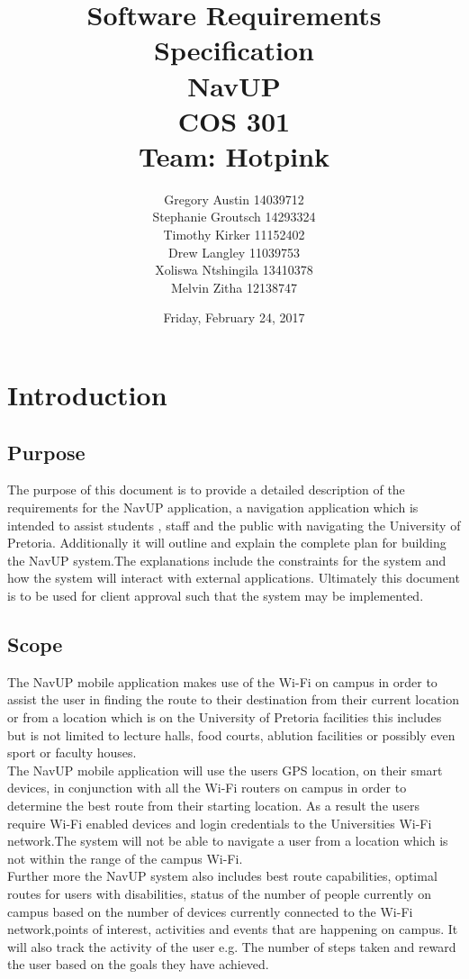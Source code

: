 \documentclass[11pt,a4paper]{article}
\title{Software Requirements Specification \\ NavUP \\ COS 301 \\ Team: Hotpink}
\date{Friday, February 24, 2017}
\author{Gregory Austin 14039712 \\ Stephanie Groutsch 14293324 \\ Timothy Kirker 11152402 \\ Drew Langley 11039753 \\ Xoliswa Ntshingila 13410378
\\ Melvin Zitha 12138747}
\begin{document}
\maketitle
\newpage
\tableofcontents

\newpage
\section{Introduction}
	\subsection{Purpose}
	The purpose of this document is to provide a detailed description of the requirements for the NavUP application, a navigation application which is intended to assist students , staff and the  public with navigating the University of Pretoria. Additionally it will outline and explain the complete plan for building the NavUP system.The explanations include the constraints for the system and how the system will interact with external applications. Ultimately this document is to be used for client approval such that the system may be implemented.

	\subsection{Scope}

		The NavUP mobile application makes use of the Wi-Fi on campus in order to assist the user in finding the route to their destination from their current location or from a location which is on the University of Pretoria facilities this includes but is not limited to lecture halls, food courts, ablution facilities or possibly even sport or faculty houses. 
		\\
		The NavUP mobile application will use the users GPS location, on their smart devices, in conjunction with all the Wi-Fi routers on campus in order to determine the best route from their starting location. As a result the users require Wi-Fi enabled devices and login credentials to the Universities Wi-Fi network.The system will not be able to navigate a user from a location which is 			not within the range of the campus Wi-Fi.
		\\
 		Further more the  NavUP system also includes best route capabilities, optimal routes for users with disabilities, status of the number of people currently on campus based on the number of devices currently connected to the Wi-Fi network,points of interest, activities and events that are happening on campus. It will also track the activity of the user e.g. The number of steps 				taken and reward the user based on the goals  they have achieved.
\end{document}
